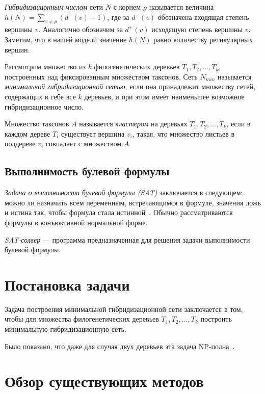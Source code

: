 \emph{Гибридизационным числом} сети $N$ с корнем $\rho$ называется величина $h(N) = \sum\limits_{v \ne \rho} (d^-(v) - 1)$, где за $d^-(v)$ обозначена входящая степень вершины $v$.
Аналогично обозначим за $d^+(v)$ исходящую степень вершины $v$.
Заметим, что в нашей модели значение $h(N)$ равно количеству ретикулярных вершин.

Рассмотрим множество из $k$ филогенетических деревьев $T_1, T_2, \dots, T_k$, построенных над фиксированным множеством таксонов.
Сеть $N_{min}$ называется \emph{минимальной гибридизационной сетью}, если она принадлежит множеству сетей, содержащих в себе все $k$ деревьев, и при этом имеет наименьшее возможное гибридизационное число.

Множество таксонов $A$ называется \emph{кластером} на деревьях $T_1, T_2, \dots, T_k$, если в каждом дереве $T_i$ существует вершина $v_i$, такая, что множество листьев в поддереве $v_i$ совпадает с множеством $A$.

\subsection{Выполнимость булевой формулы}

\emph{Задача о выполнимости булевой формулы (SAT)} заключается в следующем: можно ли назначить всем переменным, встречающимся в формуле, значения ложь и истина так, чтобы формула стала истинной~\cite{wiki:sat}. Обычно рассматриваются формулы в конъюктивной нормальной форме.

\emph{SAT-солвер} --- программа предназначенная для решения задачи выполнимости булевой формулы.


\FloatBarrier
\section{Постановка задачи}

Задача построения минимальной гибридизационной сети заключается в том, чтобы для множества филогенетических деревьев $T_1, T_2, \dots, T_k$ построить минимальную гибридизационную сеть.

Было показано, что даже для случая двух деревьев эта задача NP-полна~\cite{bordewich2007computing}.

\FloatBarrier
\section{Обзор существующих методов}

